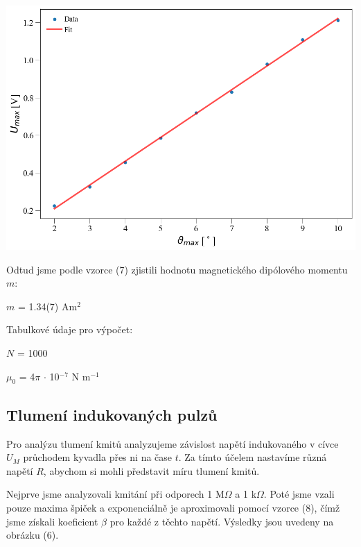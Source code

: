 \documentclass[a4paper,11pt]{article}
\begin{document}
    \hspace{10pt}  
    \begin{minipage}[t]{0.5\textwidth} 
                \vspace{0pt}   
                \par \centering
                \includegraphics[scale=0.35]{u_u}
                \captionsetup{justification=centering, font=footnotesize}
                \label{fig:u_u}
                \vspace{10pt}
                \raggedright
                \par Odtud jsme podle vzorce (7) zjistili hodnotu magnetického dipólového momentu $m$:
                \begin{center}
                    $m$ = 1.34(7) Am$^2$
                \end{center}
                Tabulkové údaje pro výpočet:
                \begin{center}
                    $N$ = 1000
                    \vspace{5pt}
                    \par $\mu_0$ = 4$\pi$ $\cdot$ 10$^{-7}$ N m$^{-1}$
                \end{center}
            \subsection{Tlumení indukovaných pulzů}
                Pro analýzu tlumení kmitů analyzujeme závislost napětí indukovaného v cívce $U_M$ průchodem kyvadla přes ni na čase $t$. Za tímto účelem nastavíme různá napětí $R$, abychom si mohli představit míru tlumení kmitů. 
                \par Nejprve jsme analyzovali kmitání při odporech 1 M$\Omega$ a 1 k$\Omega$. Poté jsme vzali pouze maxima špiček a exponenciálně je aproximovali pomocí vzorce (8), čímž jsme získali koeficient $\beta$ pro každé z těchto napětí. Výsledky jsou uvedeny na obrázku (6).  
    \end{minipage}
\end{document}
